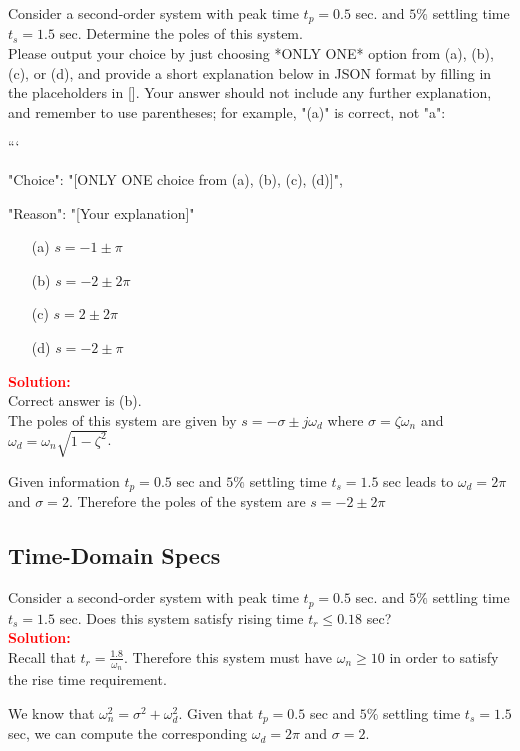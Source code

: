 \documentclass[12pt]{article}
\begin{document}
Consider a second-order system with peak time $t_p = 0.5$ sec. and $5\%$ settling time $t_s = 1.5$ sec. Determine the poles of this system. \\
Please output your choice by just choosing *ONLY ONE* option from (a), (b), (c), or (d), and provide a short explanation below in JSON format by filling in the placeholders in []. Your answer should not include any further explanation, and remember to use parentheses; for example, "(a)" is correct, not "a":

```
{

"Choice": "[ONLY ONE choice from (a), (b), (c), (d)]",

"Reason": "[Your explanation]"

}

\begin{itemize}
    \item[(a)] \(s=-1 \pm  \pi \)
    \item[(b)] \(s=-2 \pm 2 \pi \)
    \item[(c)] \(s=2 \pm 2 \pi \)
    \item[(d)] \(s=-2 \pm  \pi \)
\end{itemize}


\textbf{\textcolor{red}{Solution:}} \\
Correct answer is (b).\\
The poles of this system are given by $s= -\sigma \pm j \omega_d$ where $\sigma=\zeta \omega_n$ and $\omega_d=\omega_n \sqrt{1-\zeta^2}$.

Given information $t_p = 0.5$ sec and $5\%$ settling time $t_s = 1.5$ sec leads to $\omega_d=2 \pi$ and $\sigma=2$. Therefore the poles of the system are $s=-2 \pm 2 \pi $
\clearpage

\subsection{Time-Domain Specs}

Consider a second-order system with peak time $t_p = 0.5$ sec. and $5\%$ settling time $t_s = 1.5$ sec. Does this system satisfy rising time $t_r \leq 0.18$ sec? \\
\textbf{\textcolor{red}{Solution:}} \\
Recall that $t_r=\frac{1.8}{\omega_n}$. Therefore this system must have $\omega_n \geq 10$ in order to satisfy the rise time requirement. 

We know that $\omega_n^2 =\sigma^2 +\omega_d^2$. Given that $t_p = 0.5$ sec and $5\%$ settling time $t_s = 1.5$ sec, we can compute the corresponding $\omega_d=2 \pi$ and $\sigma=2$. 
\end{document}
